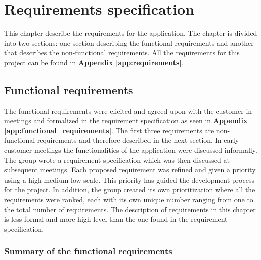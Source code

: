 
\chapter{Requirements specification}

This chapter describe the requirements for the application. The chapter is divided into two sections: one section describing the functional requirements and another that describes the non-functional requirements. All the requirements for this project can be found in \textbf{Appendix \ref{app:requirements}}.

\section{Functional requirements}

The functional requirements were elicited and agreed upon with the customer in meetings and formalized in the requirement specification as seen in \textbf{Appendix \ref{app:functional_requirements}}. The first three requirements are non-functional requirements and therefore described in the next section. In early customer meetings the functionalities of the application were discussed informally. The group wrote a requirement specification which was then discussed at subsequent meetings. Each proposed requirement was refined and given a priority using a high-medium-low scale. This priority has guided the development process for the project. In addition, the group created its own prioritization where all the requirements were ranked, each with its own unique number ranging from one to the total number of requirements. The description of requirements in this chapter is less formal and more high-level than the one found in the requirement specification. 

\subsection{Summary of the functional requirements}
\label{subsec:summary_functional_requirements}

